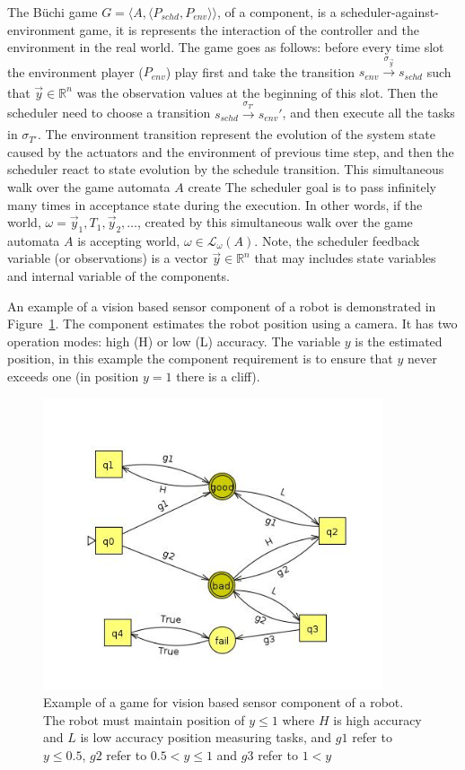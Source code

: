 \documentclass[ twoside, 12pt ]{article}
\newcommand\R{{\mathbb R}}
\newcommand{\buchi}{B\"uchi }
\begin{document}
The \buchi game $G=\langle A,\langle P_{schd}, P_{env}\rangle \rangle$, of a component, is a scheduler-against-environment game, it is represents the interaction of the controller and the environment in the real world.
The game goes as follows: before every time slot the environment player ($P_{env}$) play first and take the transition $s_{env} \xrightarrow[]{\sigma_{\vec{y}}} s_{schd}$ such that $\vec{y} \in \R^n$ was the observation values at the beginning of this slot.
Then the scheduler need to choose a transition $s_{schd} \xrightarrow[]{\sigma_{T'}} s_{env}'$, and then execute all the tasks in $\sigma_{T'}$.
The environment transition represent the evolution of the system state caused by the actuators and the environment of previous time step, and then the scheduler react to state evolution by the schedule transition.
This simultaneous walk over the game automata $A$ create
The scheduler goal is to pass infinitely many times in acceptance state during the execution.
In other words, if the world, $\omega = \vec{y}_1 , T_1, \vec{y}_2, \dots $, created by this simultaneous walk over the game automata $A$ is accepting world, $\omega \in \mathcal{L}_{\omega}(A)$.
Note, the scheduler feedback variable (or observations) is a vector $\vec{y} \in \R^n$ that may includes state variables and internal variable of the components.

An example of a vision based sensor component of a robot is demonstrated in Figure~\ref{fig:exampleGame}. 
The component estimates the robot position using a camera. It has two operation modes: high (H) or low (L) accuracy.
The variable $y$ is the estimated position, in this example the component requirement is to ensure that $y$ never exceeds one (in position $y=1$ there is a cliff). 

\begin{figure} [h]
    \centerline{\includegraphics[width=100mm]{gameExample.jpg}}
    \caption{Example of a game for vision based sensor component of a robot.
        The robot must maintain position of $y \le 1$ where $H$ is high accuracy and $L$ is low accuracy position measuring tasks, and
        $g1$ refer to $y \le 0.5$, $g2$ refer to $0.5 < y \le 1$ and $g3$ refer to $1 < y$ }
    \label{fig:exampleGame}
\end{figure}
\end{document}
